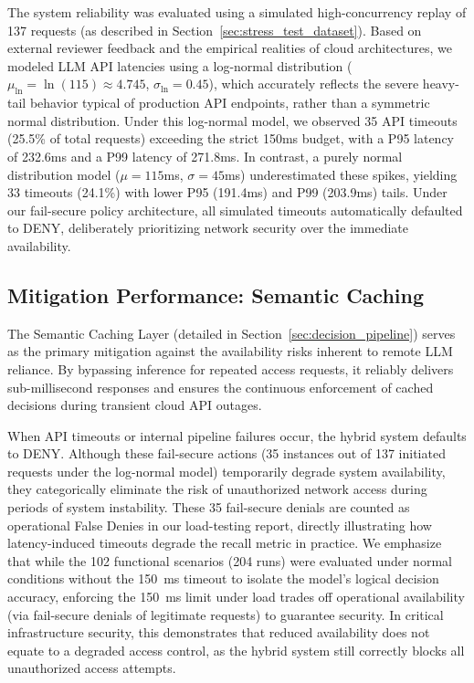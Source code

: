 \documentclass[
]{ceurart}
\begin{document}
The system reliability was evaluated using a simulated high-concurrency replay of 137 requests (as described in Section~\ref{sec:stress_test_dataset}). Based on external reviewer feedback and the empirical realities of cloud architectures, we modeled LLM API latencies using a log-normal distribution ($\mu_{\ln} = \ln(115) \approx 4.745$, $\sigma_{\ln} = 0.45$), which accurately reflects the severe heavy-tail behavior typical of production API endpoints, rather than a symmetric normal distribution. Under this log-normal model, we observed 35 API timeouts (25.5\% of total requests) exceeding the strict 150ms budget, with a P95 latency of 232.6ms and a P99 latency of 271.8ms. In contrast, a purely normal distribution model ($\mu=115$ms, $\sigma=45$ms) underestimated these spikes, yielding 33 timeouts (24.1\%) with lower P95 (191.4ms) and P99 (203.9ms) tails. Under our fail-secure policy architecture, all simulated timeouts automatically defaulted to DENY, deliberately prioritizing network security over the immediate availability.


\subsection{Mitigation Performance: Semantic Caching}\label{sec:caching_results}
The Semantic Caching Layer (detailed in Section~\ref{sec:decision_pipeline}) serves as the primary mitigation against the availability risks inherent to remote LLM reliance. By bypassing inference for repeated access requests, it reliably delivers sub-millisecond responses and ensures the continuous enforcement of cached decisions during transient cloud API outages.

When API timeouts or internal pipeline failures occur, the hybrid system defaults to DENY. Although these fail-secure actions (35 instances out of 137 initiated requests under the log-normal model) temporarily degrade system availability, they categorically eliminate the risk of unauthorized network access during periods of system instability. These 35 fail-secure denials are counted as operational False Denies in our load-testing report, directly illustrating how latency-induced timeouts degrade the recall metric in practice. We emphasize that while the 102 functional scenarios (204 runs) were evaluated under normal conditions without the 150~ms timeout to isolate the model's logical decision accuracy, enforcing the 150~ms limit under load trades off operational availability (via fail-secure denials of legitimate requests) to guarantee security. In critical infrastructure security, this demonstrates that reduced availability does not equate to a degraded access control, as the hybrid system still correctly blocks all unauthorized access attempts.
\end{document}
